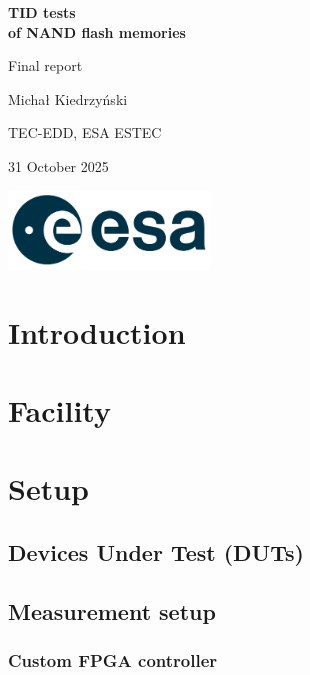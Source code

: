 \documentclass{article}
\begin{document}
\begin{titlepage}
    \centering
    \vspace*{\fill}
    
    {\Huge\bfseries TID tests\\of NAND flash memories\par}
    \vspace{1cm}
    {\LARGE Final report\par}
    \vspace{2cm}
    {\Large Michał Kiedrzyński\par}
    {\normalsize TEC-EDD, ESA ESTEC\par}
    \vspace{1cm}
    {\normalsize 31 October 2025\par}

    \vspace*{\fill}
    \includegraphics[width=0.4\textwidth]{images/ESA_logo.png} 
    
    \vspace*{2cm} 

\end{titlepage}

\newpage

\tableofcontents
\newpage

\section{Introduction}


\section{Facility}

\section{Setup}
\subsection{Devices Under Test (DUTs)}
\subsection{Measurement setup}
\subsubsection{Custom FPGA controller}
\end{document}
